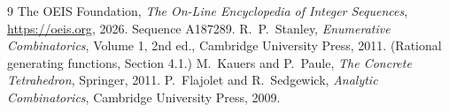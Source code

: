 \documentclass[11pt,a4paper]{article}
\theoremstyle{plain}
\theoremstyle{definition}
\begin{document}
\begin{thebibliography}{9}
 The OEIS Foundation, \emph{The On-Line Encyclopedia of Integer
Sequences}, \url{https://oeis.org}, 2026. Sequence A187289.
 R.~P.~Stanley, \emph{Enumerative Combinatorics}, Volume 1, 2nd ed.,
Cambridge University Press, 2011. (Rational generating functions, Section 4.1.)
 M.~Kauers and P.~Paule, \emph{The Concrete Tetrahedron}, Springer, 2011.
 P.~Flajolet and R.~Sedgewick, \emph{Analytic Combinatorics}, Cambridge
University Press, 2009.
\end{thebibliography}
\end{document}
